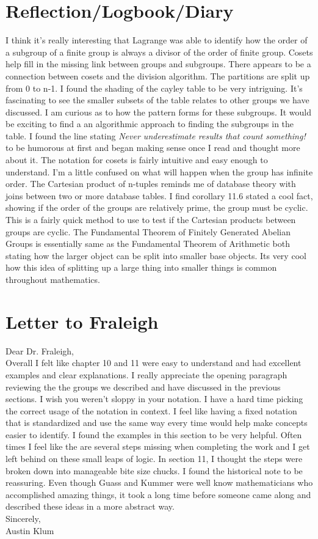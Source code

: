 \documentclass[11pt]{article}
\theoremstyle{plain}
\theoremstyle{definition}
\begin{document}
\section{Reflection/Logbook/Diary}
I think it's really interesting that Lagrange was able to identify how the order of a subgroup of a finite group is always a divisor of the order of finite group. Cosets help fill in the missing link between groups and subgroups. There appears to be a connection between cosets and the division algorithm. The partitions are split up from 0 to n-1. I found the shading of the cayley table to be very intriguing. It's fascinating to see the smaller subsets of the table relates to other groups we have discussed. I am curious as to how the pattern forms for these subgroups. It would be exciting to find a an algorithmic approach to finding the subgroups in the table. I found the line stating \textit{Never underestimate results that count something!} to be humorous at first and began making sense once I read and thought more about it. The notation for cosets is fairly intuitive and easy enough to understand. I'm a little confused on what will happen when the group has infinite order. The Cartesian product of n-tuples reminds me of database theory with joins between two or more database tables. I find corollary 11.6 stated a cool fact, showing if the order of the groups are relatively prime, the group must be cyclic. This is a fairly quick method to use to test if the Cartesian products between groups are cyclic. The Fundamental Theorem of Finitely Generated Abelian Groups is essentially same as the Fundamental Theorem of Arithmetic both stating how the larger object can be split into smaller base objects. Its very cool how this idea of splitting up a large thing into smaller things is common throughout mathematics.

\section{Letter to Fraleigh}
Dear Dr. Fraleigh,\\
Overall I felt like chapter 10 and 11 were easy to understand and had excellent examples and clear explanations. I really appreciate the opening paragraph reviewing the the groups we described and have discussed in the previous sections. I wish you weren't sloppy in your notation. I have a hard time picking the correct usage of the notation in context. I feel like having a fixed notation that is standardized and use the same way every time would help make concepts easier to identify. I found the examples in this section to be very helpful. Often times I feel like the are several steps missing when completing the work and I get left behind on these small leaps of logic. In section 11, I thought the steps were broken down into manageable bite size chucks. I found the historical note to be reassuring. Even though Guass and Kummer were well know mathematicians who accomplished amazing things, it took a long time before someone came along and described these ideas in a more abstract way. 
\\
Sincerely,\\
Austin Klum
\end{document}
